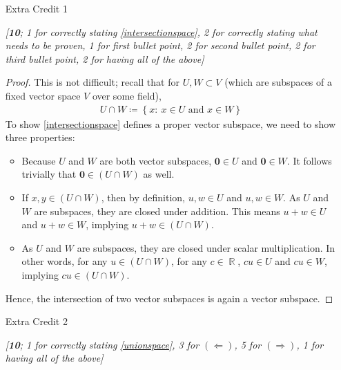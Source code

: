 \documentclass{amsart}
\theoremstyle{definition}
\theoremstyle{definition}
\DeclareMathOperator{\R}{\mathbb{R}}
\DeclareMathOperator{\1}{\mathbbm{1}}
\newcommand{\zerov}{\mathbf{0}}
\newcommand{\condset}[4]{\left\{ #1  : \: #2 #3 #4 \right\}}
\begin{document}
	\begin{enumerate}
		\item[Extra Credit 1] %
		
		\textit{[\textbf{10}; 1 for correctly stating \eqref{intersectionspace}, 2 for correctly stating what needs to be proven, 1 for first bullet point, 2 for second bullet point, 2 for third bullet point, 2 for having all of the above]}
		
		\begin{proof}
			This is not difficult; recall that for $U, W \subset V$ (which are subspaces of a fixed vector space $V$ over some field),
			\begin{align}
				\label{intersectionspace}
				U \cap W \coloneqq \condset{x}{x \in U}{\text{ and }}{x \in W}
			\end{align}
			To show \eqref{intersectionspace} defines a proper vector subspace, we need to show three properties:
			\begin{itemize}
				\item Because $U$ and $W$ are both vector subspaces, $\zerov \in U$ and $\zerov \in W$. It follows trivially that $\zerov \in (U \cap W)$ as well.
				\item If $x,y \in (U \cap W)$, then by definition, $u,w \in U$ and $u, w \in W$. As $U$ and $W$ are subspaces, they are closed under addition. This means $u+w \in U$ and $u+w \in W$, implying $u+w \in (U \cap W)$.
				\item As $U$ and $W$ are subspaces, they are closed under scalar multiplication. In other words, for any $u \in (U \cap W)$, for any $c \in \R$, $cu \in U$ and $cu \in W$, implying $cu \in (U \cap W)$.
			\end{itemize}
			Hence, the intersection of two vector subspaces is again a vector subspace.
		\end{proof}
		
		
		\item[Extra Credit 2] %
		
		\textit{[\textbf{10}; 1 for correctly stating \eqref{unionspace}, 3 for $(\Leftarrow)$, 5 for $(\Rightarrow)$, 1 for having all of the above]}
		

\end{enumerate}
\end{document}
